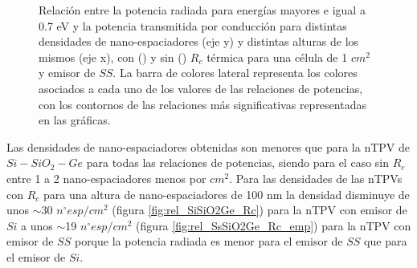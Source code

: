 \begin{figure}[H]
	\caption[Relación entre la potencia radiada para energías mayores e igual a 0.7 eV y la potencia transmitida por conducción para distintas densidades de nano-espaciadores (eje y) y distintas alturas de los mismos (eje x), con () y sin () $R_c$ térmica para una célula de 1 $cm^2$ y emisor de $SS$. La barra de colores lateral representa los colores asociados a cada uno de los valores de las relaciones de potencias, con los contornos de las relaciones más significativas representadas en las gráficas.]{\small Relación entre la potencia radiada para energías mayores e igual a 0.7 eV y la potencia transmitida por conducción para distintas densidades de nano-espaciadores (eje y) y distintas alturas de los mismos (eje x), con () y sin () $R_c$ térmica para una célula de 1 $cm^2$ y emisor de $SS$. La barra de colores lateral representa los colores asociados a cada uno de los valores de las relaciones de potencias, con los contornos de las relaciones más significativas representadas en las gráficas.
	}
	\label{fig:rels_SsSiO2Ge_PnvsRc}
\end{figure}
Las densidades de nano-espaciadores obtenidas son menores que para la nTPV de $Si-SiO_2-Ge$ para todas las relaciones de potencias, siendo para el caso sin $R_c$ entre 1 a 2 nano-espaciadores menos por $cm^2$. Para las densidades de las nTPVs con $R_c$ para una altura de nano-espaciadores de 100 nm la densidad disminuye de unos $\sim$30 $n^{\circ} esp/cm^2$ (figura \ref{fig:rel_SiSiO2Ge_Rc}) para la nTPV con emisor de $Si$ a unos $\sim$19 $n^{\circ} esp/cm^2$ (figura \ref{fig:rel_SsSiO2Ge_Rc_emp}) para la nTPV con emisor de $SS$ porque la potencia radiada es menor para el emisor de $SS$ que para el emisor de $Si$.
